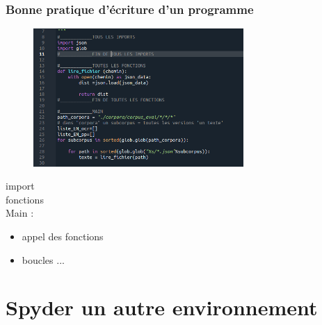 \begin{frame}
  \frametitle{Bonne pratique d'écriture d'un programme}
   \begin{figure}
  \includegraphics[width=8cm]{images/spyder_bonnes_pratiques.png}
  \end{figure}
  
\textcolor{green}{} import \\
\textcolor{green}{} fonctions\\

\textcolor{green}{} Main : 
\vspace{-0.3cm}
\begin{itemize}
\item appel des fonctions
\item boucles ...
\end{itemize}

  
\end{frame}

%  



\section{Spyder un autre environnement }  

